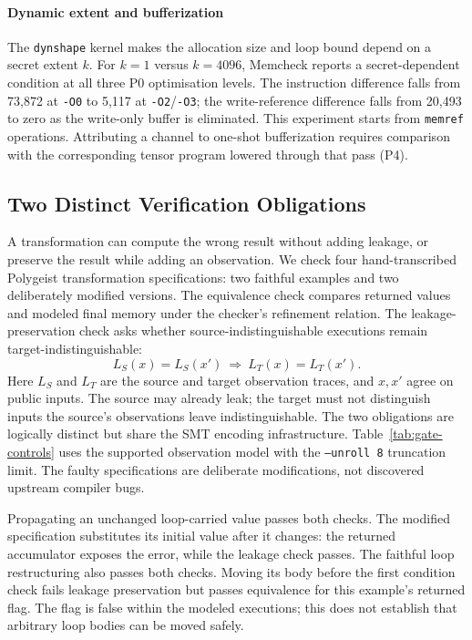 \paragraph{Dynamic extent and bufferization}
The \texttt{dynshape} kernel makes the allocation size and loop bound depend on a secret extent \(k\).
For \(k=1\) versus \(k=4096\), Memcheck reports a secret-dependent condition at all three P0 optimisation levels.
The instruction difference falls from 73,872 at \texttt{-O0} to 5,117 at \texttt{-O2}/\texttt{-O3}; the write-reference difference falls from 20,493 to zero as the write-only buffer is eliminated.
This experiment starts from \texttt{memref} operations.
Attributing a channel to one-shot bufferization requires comparison with the corresponding tensor program lowered through that pass (P4).

\subsection{Two Distinct Verification Obligations}
\label{sec:evaluation:polygeist}

A transformation can compute the wrong result without adding leakage, or preserve the result while adding an observation.
We check four hand-transcribed Polygeist transformation specifications: two faithful examples and two deliberately modified versions.
The equivalence check compares returned values and modeled final memory under the checker's refinement relation.
The leakage-preservation check asks whether source-indistinguishable executions remain target-indistinguishable:
\[
  L_S(x)=L_S(x')\ \Longrightarrow\ L_T(x)=L_T(x').
\]
Here \(L_S\) and \(L_T\) are the source and target observation traces, and \(x,x'\) agree on public inputs.
The source may already leak; the target must not distinguish inputs the source's observations leave indistinguishable.
The two obligations are logically distinct but share the SMT encoding infrastructure.
Table~\ref{tab:gate-controls} uses the supported observation model with the \texttt{--unroll 8} truncation limit.
The faulty specifications are deliberate modifications, not discovered upstream compiler bugs.


Propagating an unchanged loop-carried value passes both checks.
The modified specification substitutes its initial value after it changes: the returned accumulator exposes the error, while the leakage check passes.
The faithful loop restructuring also passes both checks.
Moving its body before the first condition check fails leakage preservation but passes equivalence for this example's returned flag.
The flag is false within the modeled executions; this does not establish that arbitrary loop bodies can be moved safely.

